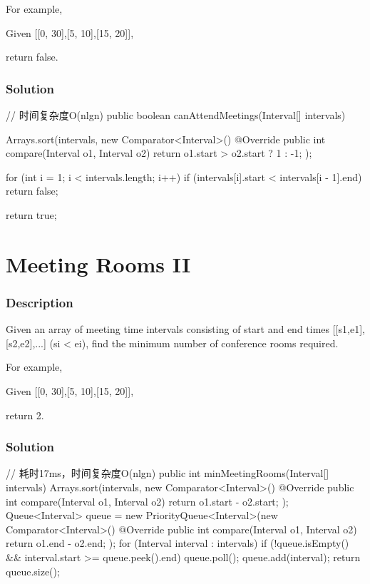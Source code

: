 For example,

Given [[0, 30],[5, 10],[15, 20]],

return false.

\subsubsection{Solution}

\begin{Code}
// 时间复杂度O(nlgn)
public boolean canAttendMeetings(Interval[] intervals) {
    Arrays.sort(intervals, new Comparator<Interval>() {
        @Override
        public int compare(Interval o1, Interval o2) {
            return o1.start > o2.start ? 1 : -1;
        }
    });

    for (int i = 1; i < intervals.length; i++) {
        if (intervals[i].start < intervals[i - 1].end) {
            return false;
        }
    }

    return true;
}
\end{Code}

\newpage

\section{Meeting Rooms II} %

\subsubsection{Description}
Given an array of meeting time intervals consisting of start and end times [[s1,e1],[s2,e2],...] (si < ei), find the minimum number of conference rooms required.

For example,

Given [[0, 30],[5, 10],[15, 20]],

return 2.

\subsubsection{Solution}

\begin{Code}
// 耗时17ms，时间复杂度O(nlgn)
public int minMeetingRooms(Interval[] intervals) {
    Arrays.sort(intervals, new Comparator<Interval>() {
        @Override
        public int compare(Interval o1, Interval o2) {
            return o1.start - o2.start;
        }
    });
    Queue<Interval> queue = new PriorityQueue<Interval>(new Comparator<Interval>() {
        @Override
        public int compare(Interval o1, Interval o2) {
            return o1.end - o2.end;
        }
    });
    for (Interval interval : intervals) {
        if (!queue.isEmpty() && interval.start >= queue.peek().end) {
            queue.poll();
        }
        queue.add(interval);
    }
    return queue.size();
}
\end{Code}

